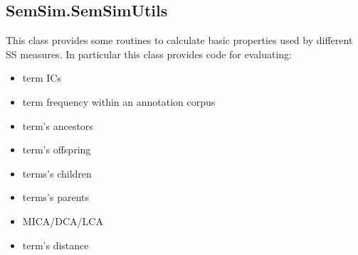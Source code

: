 \documentclass[letterpaper,10pt,english]{sphinxmanual}
\begin{document}
\subsection{SemSim.SemSimUtils}
\label{fastsemsim.SemSim:semsim-semsimutils}\label{fastsemsim.SemSim:module-fastsemsim.SemSim.SemSimUtils}
This class provides some routines to calculate basic properties used by different SS measures.
In particular this class provides code for evaluating:
\begin{itemize}
\item {} 
term ICs

\item {} 
term frequency within an annotation corpus

\item {} 
term's ancestors

\item {} 
term's offspring

\item {} 
terms's children

\item {} 
terms's parents

\item {} 
MICA/DCA/LCA

\item {} 
term's distance

\end{itemize}
\end{document}
